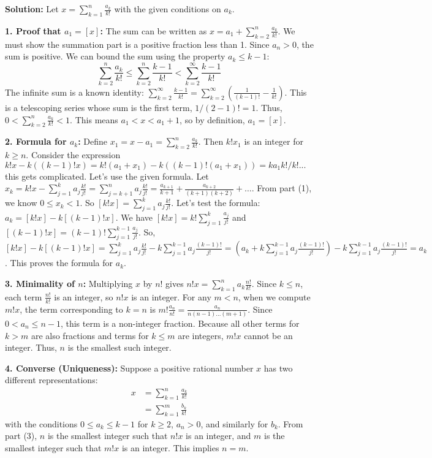 \bigskip\noindent\textbf{Solution:}
Let $x = \sum_{k=1}^n \frac{a_k}{k!}$ with the given conditions on $a_k$.

\textbf{1. Proof that $a_1 = [x]$:}
The sum can be written as $x = a_1 + \sum_{k=2}^n \frac{a_k}{k!}$. We must show the summation part is a positive fraction less than 1. Since $a_n > 0$, the sum is positive. We can bound the sum using the property $a_k \leq k-1$:
\[
\sum_{k=2}^n \frac{a_k}{k!} \leq \sum_{k=2}^n \frac{k-1}{k!} < \sum_{k=2}^{\infty} \frac{k-1}{k!}
\]
The infinite sum is a known identity: $\sum_{k=2}^{\infty} \frac{k-1}{k!} = \sum_{k=2}^{\infty} \left(\frac{1}{(k-1)!} - \frac{1}{k!}\right)$. This is a telescoping series whose sum is the first term, $1/(2-1)! = 1$.
Thus, $0 < \sum_{k=2}^n \frac{a_k}{k!} < 1$. This means $a_1 < x < a_1 + 1$, so by definition, $a_1 = [x]$.

\textbf{2. Formula for $a_k$:}
Define $x_1 = x - a_1 = \sum_{k=2}^n \frac{a_k}{k!}$. Then $k!x_1$ is an integer for $k \ge n$.
Consider the expression $k!x - k((k-1)!x) = k!(a_1+x_1) - k((k-1)!(a_1+x_1)) = ka_1k!/k! ...$ this gets complicated.
Let's use the given formula. Let $x_k = k!x - \sum_{j=1}^{k} a_j \frac{k!}{j!} = \sum_{j=k+1}^{n} a_j \frac{k!}{j!} = \frac{a_{k+1}}{k+1} + \frac{a_{k+2}}{(k+1)(k+2)} + \dots$.
From part (1), we know $0 \le x_k < 1$. So $[k!x] = \sum_{j=1}^{k} a_j \frac{k!}{j!}$.
Let's test the formula: $a_k = [k!x] - k[(k - 1)!x]$.
We have $[k!x] = k! \sum_{j=1}^k \frac{a_j}{j!}$ and $[(k-1)!x] = (k-1)! \sum_{j=1}^{k-1} \frac{a_j}{j!}$.
So, $[k!x] - k[(k-1)!x] = \sum_{j=1}^k a_j \frac{k!}{j!} - k \sum_{j=1}^{k-1} a_j \frac{(k-1)!}{j!} = \left(a_k + k\sum_{j=1}^{k-1} a_j \frac{(k-1)!}{j!}\right) - k\sum_{j=1}^{k-1} a_j \frac{(k-1)!}{j!} = a_k$.
This proves the formula for $a_k$.

\textbf{3. Minimality of $n$:}
Multiplying $x$ by $n!$ gives $n!x = \sum_{k=1}^n a_k \frac{n!}{k!}$. Since $k \le n$, each term $\frac{n!}{k!}$ is an integer, so $n!x$ is an integer.
For any $m < n$, when we compute $m!x$, the term corresponding to $k=n$ is $m! \frac{a_n}{n!} = \frac{a_n}{n(n-1)\dots(m+1)}$. Since $0 < a_n \le n-1$, this term is a non-integer fraction. Because all other terms for $k>m$ are also fractions and terms for $k\le m$ are integers, $m!x$ cannot be an integer. Thus, $n$ is the smallest such integer.

\textbf{4. Converse (Uniqueness):}
Suppose a positive rational number $x$ has two different representations:
\begin{align*}
x &= \sum_{k=1}^n \frac{a_k}{k!}\\
&= \sum_{k=1}^m \frac{b_k}{k!}
\end{align*}
with the conditions $0 \le a_k \le k-1$ for $k \ge 2$, $a_n > 0$, and similarly for $b_k$.
From part (3), $n$ is the smallest integer such that $n!x$ is an integer, and $m$ is the smallest integer such that $m!x$ is an integer. This implies $n=m$.


